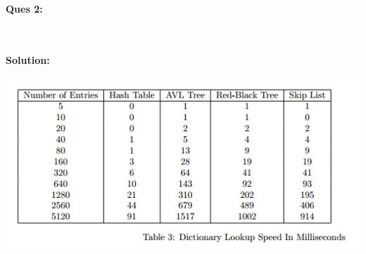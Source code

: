 \documentclass[a4paper,12pt]{article}
\begin{document}
\textbf{Ques 2: }
\begin{minipage}[t]{16cm}
\lipsum[1]
\end{minipage}\\ \\
\textbf{Solution:}
\begin{minipage}[t]{16cm}
\lipsum[2]
\includegraphics{1.PNG}
\end{minipage}
\end{document}
